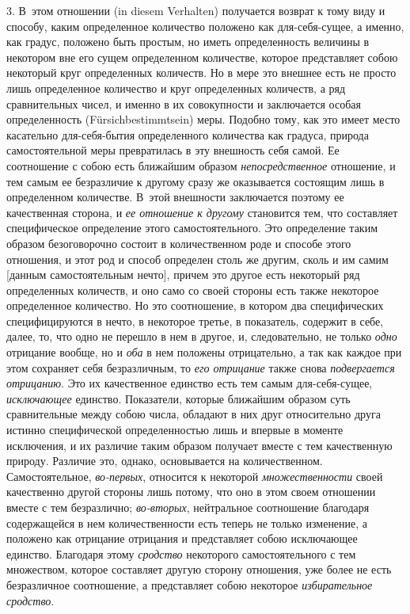 3. В~этом отношении (in diesem Verhalten) получается возврат к тому виду и
способу, каким определенное количество положено как для-себя-сущее, а
именно, как градус, положено быть простым, но иметь определенность величины
в некотором вне его сущем определенном количестве, которое представляет
собою некоторый круг определенных количеств. Но в мере это внешнее есть не
просто лишь определенное количество и круг определенных количеств, а ряд
сравнительных чисел, и именно в их совокупности и заключается особая
определенность (Fürsichbestimmtsein) меры. Подобно тому, как это имеет
место касательно для-себя-бытия определенного количества как градуса,
природа самостоятельной меры превратилась в эту внешность себя самой. Ее
соотношение с собою есть ближайшим образом
{\em непосредственное} отношение, и тем самым ее
безразличие к другому сразу же оказывается состоящим лишь в определенном
количестве. В~этой внешности заключается поэтому ее качественная сторона, и
{\em ее отношение к другому} становится тем, что
составляет специфическое определение этого самостоятельного. Это
определение таким образом безоговорочно состоит в количественном роде и
способе этого отношения, и этот род и способ определен столь же другим,
сколь и им самим [данным самостоятельным нечто], причем это другое есть
некоторый ряд определенных количеств, и оно само со своей стороны есть
также некоторое определенное количество. Но это соотношение, в котором два
специфических специфицируются в нечто, в некоторое третье, в показатель,
содержит в себе, далее, то, что одно не перешло в нем в другое, и,
следовательно, не только {\em одно} отрицание вообще,
но и {\em оба} в нем положены отрицательно, а так как
каждое при этом сохраняет себя безразличным, то
{\em его отрицание} также снова
{\em подвергается отрицанию}. Это их качественное
единство есть тем самым для-себя-сущее,
{\em исключающее} единство. Показатели, которые
ближайшим образом суть сравнительные между собою числа, обладают в них друг
относительно друга истинно специфической определенностью лишь и впервые в
моменте исключения, и их различие таким образом получает вместе с тем
качественную природу. Различие это, однако, основывается на количественном.
Самостоятельное, {\em во-первых}, относится к некоторой
{\em множественности} своей качественно другой стороны
лишь потому, что оно в этом своем отношении вместе с тем безразлично;
{\em во-вторых}, нейтральное соотношение благодаря
содержащейся в нем количественности есть теперь не только изменение, а
положено как отрицание отрицания и представляет собою исключающее единство.
Благодаря этому {\em сродство} некоторого
самостоятельного с тем множеством, которое составляет другую сторону
отношения, уже более не есть безразличное соотношение, а представляет собою
некоторое {\em избирательное сродство}.

